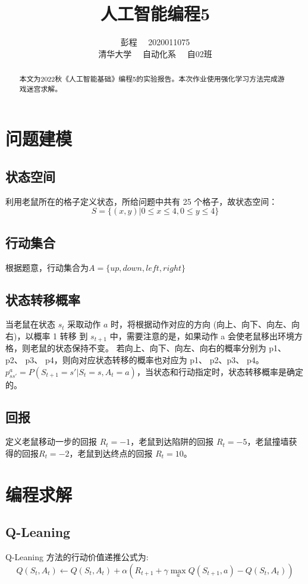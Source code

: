\documentclass[lang=cn,a4paper]{elegantpaper}
\title{人工智能编程5}
\author{彭程~~ 2020011075 \\ 清华大学~~ 自动化系~~ 自02班}
\date{\zhtoday}
\begin{document}
\maketitle

\begin{abstract}
本文为2022秋《人工智能基础》编程5的实验报告。本次作业使用强化学习方法完成游戏迷宫求解。
\end{abstract}

\section{问题建模}

\subsection{状态空间}
利用老鼠所在的格子定义状态，所给问题中共有 25 个格子，故状态空间：
$$S = \{ (x, y)|0 \le x \le 4, 0 \le y \le 4 \}$$
\subsection{行动集合}
根据题意，行动集合为$ A = \{up, down, left, right\}$
\subsection{状态转移概率}
当老鼠在状态 $s_t$ 采取动作 $a$ 时，将根据动作对应的方向 (向上、向下、向左、向右)，以概率 1 转移
到 $s_{t+1}$ 中，需要注意的是，如果动作 a 会使老鼠移出环境方格，则老鼠的状态保持不变。
若向上、向下、向左、向右的概率分别为 p1、 p2、 p3、 p4，则向对应状态转移的概率也对应为 p1、 p2、p3、 p4。$p_{ss'}^a = P(S_{t+1} = s' | S_t = s, A_t = a)$，当状态和行动指定时，状态转移概率是确定的。
\subsection{回报}
定义老鼠移动一步的回报 $R_t = -1$，老鼠到达陷阱的回报 $R_t = -5$，老鼠撞墙获得的回报$R_t = -2$，老鼠到达终点的回报 $R_t = 10$。


\section{编程求解}
\subsection{Q-Leaning}

Q-Leaning 方法的行动价值递推公式为:
$$
Q\left(S_{t}, A_{t}\right) \leftarrow Q\left(S_{t}, A_{t}\right)+\alpha\left(R_{t+1}+\gamma \max_a Q\left(S_{t+1}, a\right)-Q\left(S_{t}, A_{t}\right) \right)
$$
\end{document}
